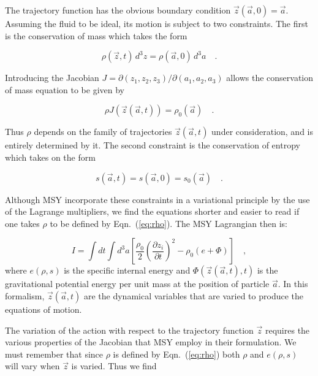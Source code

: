 \documentclass{article}
\def\a{{\vec a}}
\def\z{{\vec z}}
\def\.{{\quad .}}
\def\_,{{\quad ,}}
\begin{document}
The trajectory function has the obvious boundary condition
${\vec z}({\vec a},0) = {\vec a}$.  Assuming the fluid to be ideal, its motion
is subject to two constraints.  The first is the conservation of mass which
takes the form

\begin{equation}
    \rho({\vec z},t)\,d^3 z = \rho({\vec a},0)\,d^3 a \.
\end{equation}

Introducing the Jacobian $J ={\partial(z_1,z_2,z_3)}/{\partial(a_1,a_2,a_3)}$
allows the conservation of mass equation to be given by

\begin{equation}\label{eq:rho}
    \rho J({\vec z}(\a,t)) = \rho_0(\a) \.
\end{equation}

Thus $\rho$ depends on the family of trajectories $\z(\a,t)$ under
consideration, and is entirely determined by it.  The second constraint is the
conservation of entropy which takes on the form

\begin{equation}
    s(\a,t) = s({\vec a},0) = s_0(\vec a) \.
\end{equation}

Although MSY incorporate these constraints in a variational principle by the
use of the Lagrange multipliers, we find the equations shorter and easier to
read if one takes $\rho$ to be defined by Eqn.~(\ref{eq:rho}).
The MSY Lagrangian then is:

\begin{equation}\label{eq:MSY}
    I  =  \int\!\! dt \int\!\! d^3a \left[\frac{\rho_0}{2} \left(
          \frac{\partial z_i}{\partial t}\right)^2 - \rho_0(e+\Phi) \right] \_,
\end{equation}
%
where $e(\rho,s)$ is the specific internal energy and $\Phi(\z(\a,t),t)$ is the
gravitational potential energy per unit mass at the position of particle $\a$.
In this formalism, ${\vec z}(\a,t)$ are the dynamical variables that are varied
to produce the equations of motion.

The variation of the action with respect to the trajectory function ${\vec z}$
requires the various properties of the Jacobian that MSY employ in their
formulation. We must remember that since $\rho$ is defined by
Eqn.~(\ref{eq:rho}) both $\rho$ and $e(\rho,s)$ will vary when $\z$ is varied.
Thus we find
\end{document}
